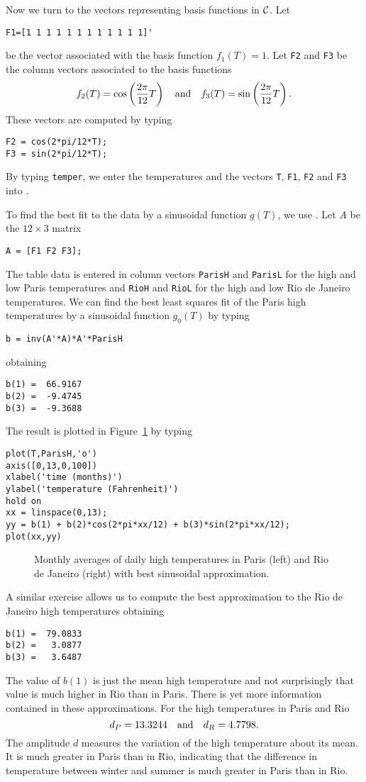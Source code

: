 Now we turn to the vectors representing basis functions in ${\cal C}$.
Let
\begin{verbatim}
F1=[1 1 1 1 1 1 1 1 1 1 1 1]'
\end{verbatim}
be the vector associated with the basis function $f_1(T)=1$. Let  {\tt F2}
and {\tt F3} be the column vectors associated to the basis functions
\[
f_2(T) = \cos\left(\frac{2\pi}{12} T\right) \quad\mbox{and}\quad
f_3(T) = \sin\left(\frac{2\pi}{12} T\right).
\]
These vectors are computed by typing
\begin{verbatim}
F2 = cos(2*pi/12*T);
F3 = sin(2*pi/12*T);
\end{verbatim}
By typing {\tt temper}, we enter the temperatures and the vectors {\tt T},
{\tt F1},  {\tt F2} and {\tt F3} into \Matlabp.

To find the best fit to the data by a sinusoidal function $g(T)$, we use
.  Let $A$ be the $12\times 3$ matrix
\begin{verbatim}
A = [F1 F2 F3];
\end{verbatim}

The table data is entered in column vectors {\tt ParisH} and {\tt ParisL} for
the high and low Paris temperatures and {\tt RioH} and {\tt RioL} for the
high and low Rio de Janeiro temperatures.  We can find the best least squares
fit of the Paris high temperatures by a sinusoidal function $g_0(T)$ by typing
\begin{verbatim}
b = inv(A'*A)*A'*ParisH
\end{verbatim}
obtaining
\begin{verbatim}
b(1) =  66.9167
b(2) =  -9.4745
b(3) =  -9.3688
\end{verbatim}
The result is plotted in Figure~\ref{F:ParisH} by typing
\begin{verbatim}
plot(T,ParisH,'o')
axis([0,13,0,100])
xlabel('time (months)')
ylabel('temperature (Fahrenheit)')
hold on
xx = linspace(0,13);
yy = b(1) + b(2)*cos(2*pi*xx/12) + b(3)*sin(2*pi*xx/12);
plot(xx,yy)
\end{verbatim}

\begin{figure}[htb]
     \centerline{%
     }
     \caption{Monthly averages of daily high temperatures in Paris (left) and
	Rio de Janeiro (right) with best sinusoidal approximation.}
     \label{F:ParisH}
\end{figure}

A similar exercise allows us to compute the best approximation to the
Rio de Janeiro high temperatures obtaining
\begin{verbatim}
b(1) =  79.0833
b(2) =   3.0877
b(3) =   3.6487
\end{verbatim}
The value of $b(1)$ is just the mean high temperature and not surprisingly
that value is much higher in Rio than in Paris.  There is yet more
information contained in these approximations.   For
the high temperatures in Paris and Rio
\[
d_P = 13.3244 \quad\mbox{and}\quad d_R = 4.7798.
\]
The amplitude $d$ measures the variation of the high temperature about its
mean.  It is much greater in Paris than in Rio, indicating that the
difference in temperature between winter and summer is much greater in Paris
than in Rio.

